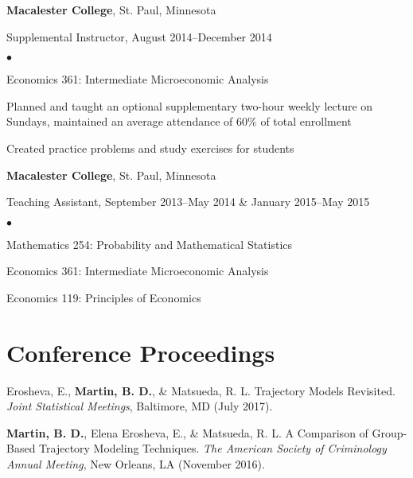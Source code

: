 \documentclass[margin,centered]{res}
\newenvironment{list1}{
  \begin{list}{\ding{113}}{%
      \setlength{\itemsep}{0in}
      \setlength{\parsep}{0in} \setlength{\parskip}{0in}
      \setlength{\topsep}{0in} \setlength{\partopsep}{0in}
      \setlength{\leftmargin}{0.17in}}}{\end{list}}
\newenvironment{list2}{
  \begin{list}{$\bullet$}{%
      \setlength{\itemsep}{0in}
      \setlength{\parsep}{0in} \setlength{\parskip}{0in}
      \setlength{\topsep}{0in} \setlength{\partopsep}{0in}
      \setlength{\leftmargin}{0.2in}}}{\end{list}}
\begin{document}
\begin{resume}
{\bf Macalester College}, St. Paul, Minnesota
\begin{list1}
\item[] Supplemental Instructor, August 2014--December 2014
\begin{list2}
\vspace*{.05in}
\item Economics 361: Intermediate Microeconomic Analysis
\item Planned and taught an optional supplementary two-hour weekly lecture on Sundays, maintained an average attendance of 60\% of total enrollment
\item Created practice problems and study exercises for students
\end{list2}
\end{list1}

{\bf Macalester College}, St. Paul, Minnesota
\begin{list1}
\item[] Teaching Assistant, September 2013--May 2014 \& January 2015--May 2015
\begin{list2}
\vspace*{.05in}
\item Mathematics 254: Probability and Mathematical Statistics
\item Economics 361: Intermediate Microeconomic Analysis
\item Economics 119: Principles of Economics
\end{list2}
\end{list1}

\section{\sc Conference Proceedings}
Erosheva, E., \textbf{Martin, B. D.}, \& Matsueda, R. L. Trajectory Models Revisited. \textit{Joint Statistical Meetings}, Baltimore, MD (July 2017).

\textbf{Martin, B. D.}, Elena Erosheva, E., \& Matsueda, R. L. A Comparison of Group-Based Trajectory Modeling Techniques. \textit{The American Society of Criminology Annual Meeting}, New Orleans, LA (November 2016).


\end{resume}
\end{document}

